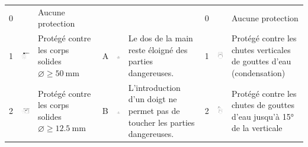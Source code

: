 \begin{landscape}
\begin{xltabular}{\linewidth}{p{0.3cm} m{2cm} X p{0.3cm} m{2cm} X p{0.3cm} m{2.2cm} X}
0 		& 									& Aucune protection	&	&	&	& 0 	&	&	Aucune protection \\
1 		& 	\includegraphics[scale=1.1]{1X.png} & Protégé contre les corps solides $\diameter \geq \SI{50}{\milli\meter}$  	&	A & \includegraphics[width=2cm]{A.png}	&	Le dos de la main reste éloigné des parties dangereuses.	& 1 & 	\includegraphics[scale=1.1]{X1.png}	&	Protégé contre les chutes verticales de gouttes d'eau (condensation) \\
2 		& 	\includegraphics[scale=1.1]{2X.png} & Protégé contre les corps solides $\diameter \geq \SI{12,5}{\milli\meter}$  	& B	& \includegraphics[width=2cm]{B.png}	&	L'introduction d'un doigt ne permet pas de toucher les parties dangereuses. & 2 & 	\includegraphics[scale=1.1]{X2.png}	&	Protégé contre les chutes de gouttes d'eau jusqu'à 15° de la verticale \\

\end{xltabular}
\end{landscape}
